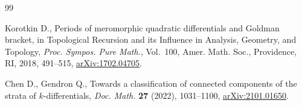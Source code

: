 \begin{thebibliography}{99}

Korotkin D., Periods of meromorphic quadratic differentials and {G}oldman
 bracket, in Topological Recursion and its Influence in Analysis, Geometry,
 and Topology, \textit{Proc. Sympos. Pure Math.}, Vol.~100, Amer. Math. Soc.,
 Providence, RI, 2018, 491--515, \href{https://arxiv.org/abs/1702.04705}{arXiv:1702.04705}.

Chen D., Gendron Q., Towards a classification of connected components of the
 strata of {$k$}-differentials, \textit{Doc. Math.} \textbf{27} (2022),
 1031--1100, \href{https://arxiv.org/abs/2101.01650}{arXiv:2101.01650}.


\end{thebibliography}
